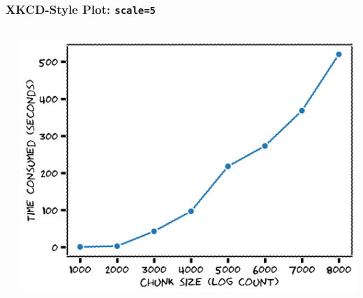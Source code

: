 \documentclass[xcolor={svgnames}]{beamer}
\newcommand{\pyfile}[2][]{}
\begin{document}
\begin{frame}[t,fragile]
    \frametitle{XKCD-Style Plot: \texttt{scale=5}}
    \vspace{-2mm}
    \begin{columns}[T]
        \begin{column}{0.49\textwidth}
            \pyfile[style=footnotesize]{examples/xkcd-3.py}
        \end{column}
        \begin{column}{0.51\textwidth}
            \includegraphics[width=\textwidth]{img/xkcd-3.png}
        \end{column}
    \end{columns}
\end{frame}
\end{document}

